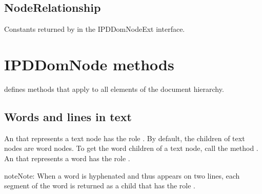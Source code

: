 \documentclass[letterpaper,12pt,english,openany,oneside]{sphinxmanual}
\begin{document}
\subsection{NodeRelationship}
\label{\detokenize{Access_DOM:noderelationship}}
Constants returned by  in the IPDDomNodeExt interface.

\begin{sphinxVerbatim}[commandchars=\\\{\}]
  
    
    
    
    
    
    
\end{sphinxVerbatim}




\section{IPDDomNode methods}
\label{\detokenize{Access_DOM:ipddomnode-methods}}
 defines methods that apply to all elements of the document hierarchy.




\subsection{Words and lines in text}
\label{\detokenize{Access_DOM:words-and-lines-in-text}}
An  that represents a text node has the role  . By default, the children of text nodes are word nodes. To get the word children of a text node, call the  method  . An  that represents a word has the role  .

\begin{sphinxadmonition}{note}{Note:}
When a word is hyphenated and thus appears on two lines, each segment of the word is returned as a child that has the role  .
\end{sphinxadmonition}
\end{document}
